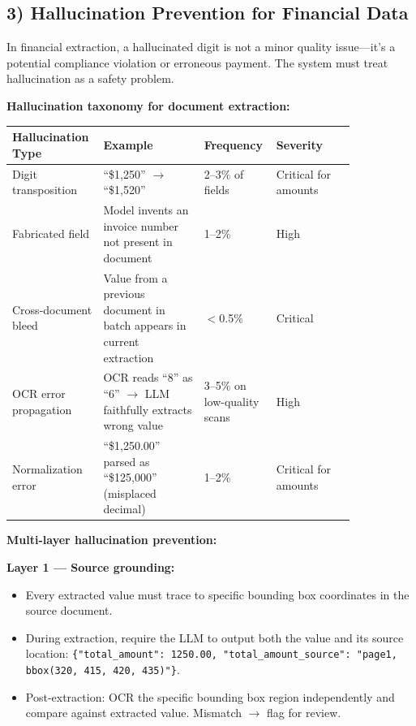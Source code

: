 \subsection*{3) Hallucination Prevention for Financial Data}

In financial extraction, a hallucinated digit is not a minor quality issue---it's a potential compliance violation or erroneous payment. The system must treat hallucination as a safety problem.

\textbf{Hallucination taxonomy for document extraction:}

\begin{tabular}{|p{0.20\linewidth}|p{0.28\linewidth}|p{0.14\linewidth}|p{0.22\linewidth}|}
\hline
\textbf{Hallucination Type} & \textbf{Example} & \textbf{Frequency} & \textbf{Severity} \\
\hline
Digit transposition & ``\$1,250'' $\rightarrow$ ``\$1,520'' & 2--3\% of fields & Critical for amounts \\
\hline
Fabricated field & Model invents an invoice number not present in document & 1--2\% & High \\
\hline
Cross-document bleed & Value from a previous document in batch appears in current extraction & $<$0.5\% & Critical \\
\hline
OCR error propagation & OCR reads ``8'' as ``6'' $\rightarrow$ LLM faithfully extracts wrong value & 3--5\% on low-quality scans & High \\
\hline
Normalization error & ``\$1,250.00'' parsed as ``\$125,000'' (misplaced decimal) & 1--2\% & Critical for amounts \\
\hline
\end{tabular}

\textbf{Multi-layer hallucination prevention:}

\textbf{Layer 1 --- Source grounding:}
\begin{itemize}
  \item Every extracted value must trace to specific bounding box coordinates in the source document.
  \item During extraction, require the LLM to output both the value and its source location: \texttt{\{"total\_amount": 1250.00, "total\_amount\_source": "page1, bbox(320, 415, 420, 435)"\}}.
  \item Post-extraction: OCR the specific bounding box region independently and compare against extracted value. Mismatch $\rightarrow$ flag for review.
\end{itemize}

